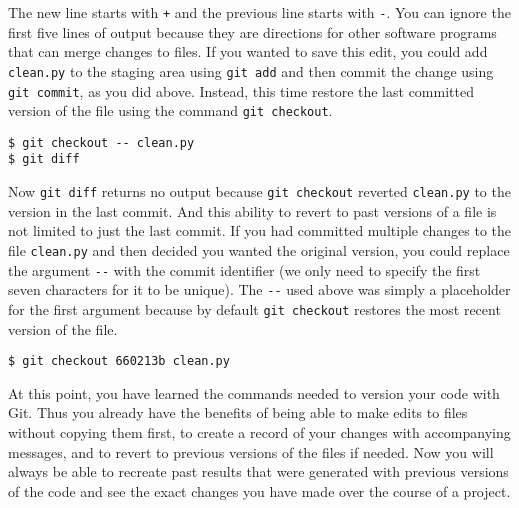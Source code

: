 The new line starts with \verb|+| and the previous line starts with \verb|-|.
You can ignore the first five lines of output because they are directions for other software programs that can merge changes to files.
If you wanted to save this edit, you could add \verb|clean.py| to the staging area using \verb|git add| and then commit the change using \verb|git commit|, as you did above.
Instead, this time restore the last committed version of the file using the command \verb|git checkout|.

\begin{verbatim}
$ git checkout -- clean.py
$ git diff
\end{verbatim}

Now \verb|git diff| returns no output because \verb|git checkout| reverted \verb|clean.py| to the version in the last commit.
And this ability to revert to past versions of a file is not limited to just the last commit.
If you had committed multiple changes to the file \verb|clean.py| and then decided you wanted the original version, you could replace the argument \verb|--| with the commit identifier (we only need to specify the first seven characters for it to be unique).
The \verb|--| used above was simply a placeholder for the first argument because by default \verb|git checkout| restores the most recent version of the file.

\begin{verbatim}
$ git checkout 660213b clean.py
\end{verbatim}


At this point, you have learned the commands needed to version your code with Git.
Thus you already have the benefits of being able to make edits to files without copying them first, to create a record of your changes with accompanying messages, and to revert to previous versions of the files if needed.
Now you will always be able to recreate past results that were generated with previous versions of the code and see the exact changes you have made over the course of a project.





  
  
  
  
  
  